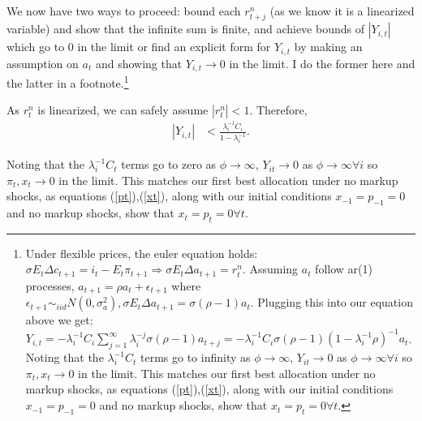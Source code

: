 \documentclass[11pt]{article} %
\begin{document}
We now have two ways to proceed: bound each $r_{t+j}^n$ (as we know it is a linearized variable) and show that the infinite sum is finite, and achieve bounds of $|Y_{i,t}|$ which go to $0$ in the limit or find an explicit form for $Y_{i,t}$ by making an assumption on $a_t$ and showing that $Y_{i,t} \rightarrow 0$ in the limit. I do the former here and the latter in a footnote.\footnote{Under flexible prices, the euler equation holds: $\sigma E_t \Delta c_{t+1} = i_t - E_t \pi_{t+1} \Rightarrow \sigma E_t\Delta a_{t+1} = r_t^n $. Assuming $a_t$ follow ar(1) processes,  $a_{t+1} = \rho a_t + \epsilon_{t+1}$ where $\epsilon_{t+1} \sim_{iid} N(0,\sigma_a^2), \sigma E_t\Delta a_{t+1} = \sigma(\rho - 1)a_t$. Plugging this into our equation above we get: $Y_{i,t} = -\lambda_i^{-1}C_i \sum_{j=1}^{\infty}\lambda_i^{-j} \sigma(\rho - 1)a_{t+j} = -\lambda_i^{-1}C_i  \sigma(\rho - 1)(1-\lambda_i^{-1}\rho)^{-1}a_{t}$. Noting that the $\lambda_i^{-1}C_t$ terms go to infinity as $\phi \rightarrow \infty$, $Y_{it}\rightarrow 0$ as $\phi \rightarrow \infty \forall i$ so $\pi_t,x_t \rightarrow 0$ in the limit. This matches our first best allocation under no markup shocks, as equations (\ref{pt}),(\ref{xt}), along with our initial conditions $x_{-1} = p_{-1} = 0$ and no markup shocks, show that $x_t = p_t = 0 \forall t$.}

As $r_t^n$ is linearized, we can safely assume $|r_t^n|<1$. Therefore,
\begin{align*}
|Y_{i,t}| &< \frac{\lambda_i^{-1}C_i}{1-\lambda_i^{-1}}.
\end{align*}


Noting that the $\lambda_i^{-1}C_t$ terms go to zero as $\phi \rightarrow \infty$, $Y_{it}\rightarrow 0$ as $\phi \rightarrow \infty \forall i$ so $\pi_t,x_t \rightarrow 0$ in the limit. This matches our first best allocation under no markup shocks, as equations (\ref{pt}),(\ref{xt}), along with our initial conditions $x_{-1} = p_{-1} = 0$ and no markup shocks, show that $x_t = p_t = 0 \forall t$.
\end{document}
